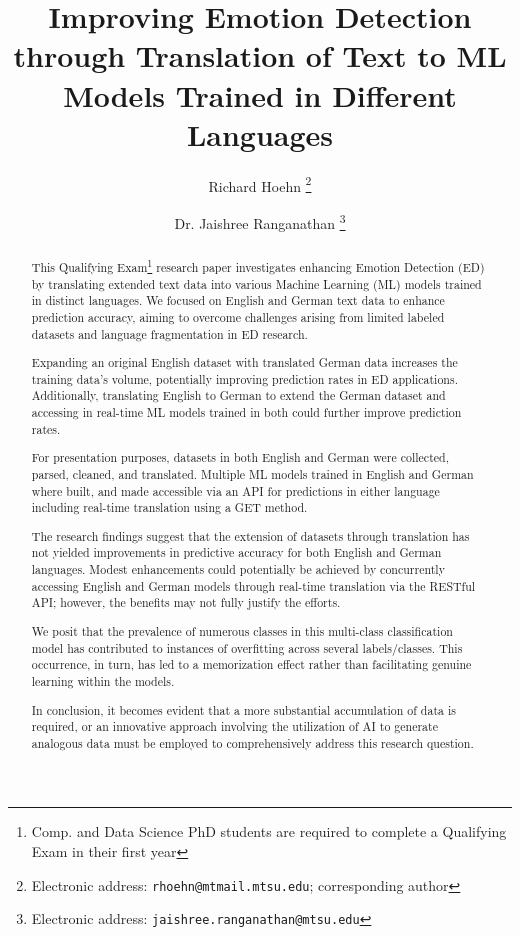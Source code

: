 \documentclass[11pt]{article}
\title{Improving Emotion Detection through Translation of Text to ML Models Trained in Different Languages}
\author{Richard Hoehn%
	\thanks{Electronic address: \texttt{rhoehn@mtmail.mtsu.edu}; corresponding author}}
\affil{Middle Tennessee State University}
\author{Dr. Jaishree Ranganathan%
	\thanks{Electronic address: \texttt{jaishree.ranganathan@mtsu.edu}}}
\affil{Middle Tennessee State University}
\begin{document}
\maketitle

\begin{abstract}
This Qualifying Exam\footnote{Comp. and Data Science PhD students are required to complete a Qualifying Exam in their first year} research paper investigates enhancing Emotion Detection (ED) by translating extended text data into various Machine Learning (ML) models trained in distinct languages. We focused on English and German text data to enhance prediction accuracy, aiming to overcome challenges arising from limited labeled datasets and language fragmentation in ED research.

Expanding an original English dataset with translated German data increases the training data's volume, potentially improving prediction rates in ED applications. Additionally, translating English to German to extend the German dataset and accessing in real-time ML models trained in both could further improve prediction rates.

For presentation purposes, datasets in both English and German were collected, parsed, cleaned, and translated. Multiple ML models trained in English and German where built, and made accessible via an API for predictions in either language including real-time translation using a GET method.

The research findings suggest that the extension of datasets through translation has not yielded improvements in predictive accuracy for both English and German languages. Modest enhancements could potentially be achieved by concurrently accessing English and German models through real-time translation via the RESTful API; however, the benefits may not fully justify the efforts.

We posit that the prevalence of numerous classes in this multi-class classification model has contributed to instances of overfitting across several labels/classes. This occurrence, in turn, has led to a memorization effect rather than facilitating genuine learning within the models.

In conclusion, it becomes evident that a more substantial accumulation of data is required, or an innovative approach involving the utilization of AI to generate analogous data must be employed to comprehensively address this research question.
\end{abstract}
\clearpage

\tableofcontents
\end{document}

